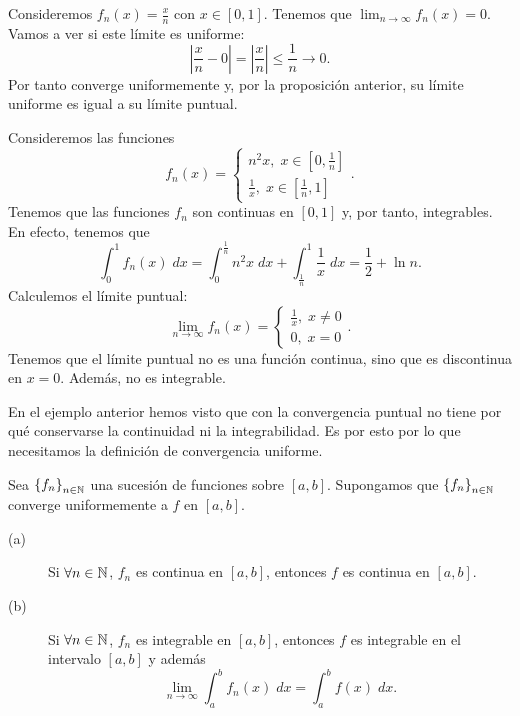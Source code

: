 \begin{eg}
	\normalfont Consideremos $\displaystyle f_{n}\left(x\right) = \frac{x}{n} $ con $\displaystyle x \in \left[0,1\right]  $. Tenemos que $\displaystyle \lim_{n \to \infty}f_{n}\left(x\right) = 0 $. Vamos a ver si este límite es uniforme:
	\[ \left|\frac{x}{n}-0\right| = \left|\frac{x}{n}\right| \leq \frac{1}{n} \to 0 .\]
	Por tanto converge uniformemente y, por la proposición anterior, su límite uniforme es igual a su límite puntual.
\end{eg}
\begin{eg}
\normalfont Consideremos las funciones 
\[f_{n}\left(x\right) = 
\begin{cases}
	n^{2}x, \; x \in \left[0,\frac{1}{n}\right] \\
	\frac{1}{x}, \; x \in \left[\frac{1}{n}, 1\right] 
\end{cases}
.\]
Tenemos que las funciones $\displaystyle f_{n} $ son continuas en $\displaystyle \left[0,1\right]  $ y, por tanto, integrables. En efecto, tenemos que 
\[\int^{1}_{0} f_{n}\left(x\right) \; dx = \int^{\frac{1}{n}}_{0} n^{2}x \; dx + \int^{1}_{\frac{1}{n}} \frac{1}{x} \; dx = \frac{1}{2} + \ln n.\]
Calculemos el límite puntual:
\[\lim_{n \to \infty}f_{n}\left(x\right) = 
\begin{cases}
\frac{1}{x}, \; x \neq 0 \\
0, \; x = 0
\end{cases}
.\]
Tenemos que el límite puntual no es una función continua, sino que es discontinua en $\displaystyle x = 0 $. Además, no es integrable. 
\end{eg}
\begin{observation}
\normalfont En el ejemplo anterior hemos visto que con la convergencia puntual no tiene por qué conservarse la continuidad ni la integrabilidad. Es por esto por lo que necesitamos la definición de convergencia uniforme. 
\end{observation}
\begin{ftheorem}[]
	\normalfont Sea $\displaystyle \left\{ f_{n}\right\} _{n\in\mathbb{N}} $ una sucesión de funciones sobre $\displaystyle \left[a,b\right]  $. Supongamos que $\displaystyle \left\{ f_{n}\right\} _{n\in\mathbb{N}} $ converge uniformemente a $\displaystyle f $ en $\displaystyle \left[a,b\right]  $. 
	\begin{description}
		\item[(a)] Si $\displaystyle \forall n \in \mathbb{N} $, $\displaystyle f_{n} $ es continua en $\displaystyle \left[a,b\right]  $, entonces $\displaystyle f $ es continua en $\displaystyle \left[a,b\right]  $.
		\item[(b)] Si $\displaystyle \forall n \in \mathbb{N} $, $\displaystyle f_{n} $ es integrable en $\displaystyle \left[a,b\right]  $, entonces $\displaystyle f $ es integrable en el intervalo $\displaystyle \left[a,b\right]  $ y además
			\[\lim_{n \to \infty}\int^{b}_{a} f_{n}\left(x\right) \; dx = \int^{b}_{a} f\left(x\right) \; dx .\]
	\end{description}
\end{ftheorem}
